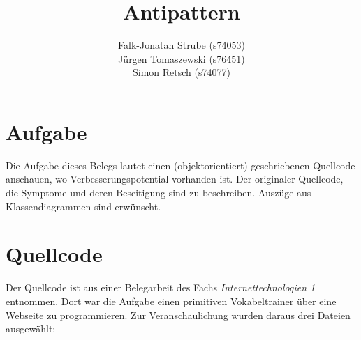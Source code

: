 \documentclass{scrartcl}
\title{Antipattern}
\author{Falk-Jonatan Strube (s74053)\texorpdfstring{\\}{, }
Jürgen Tomaszewski (s76451)\texorpdfstring{\\}{, }
Simon Retsch (s74077)}
\begin{document}
\maketitle
\ofoot{}
\tableofcontents

\section{Aufgabe}
Die Aufgabe dieses Belegs lautet einen (objektorientiert) geschriebenen Quellcode anschauen, wo Verbesserungspotential vorhanden ist. Der originaler Quellcode, die Symptome und deren Beseitigung sind zu beschreiben. Auszüge aus Klassendiagrammen sind erwünscht.

\section{Quellcode}
\label{quellcode}
Der Quellcode ist aus einer Belegarbeit des Fachs \emph{Internettechnologien 1} entnommen. Dort war die Aufgabe einen primitiven Vokabeltrainer über eine Webseite zu programmieren. 
Zur Veranschaulichung wurden daraus drei Dateien ausgewählt:
\end{document}
